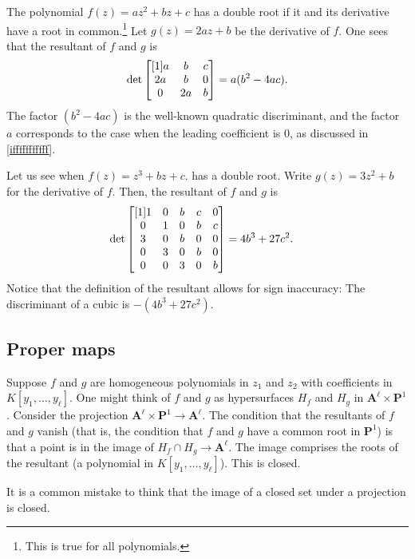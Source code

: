 \documentclass [11 pt, oneside] {article}
\begin{document}
\begin{example}[ ]\label{}\text{}
The polynomial $f(z)=az^2+bz+c$ has a double root if it and its derivative have a root in common.\footnote{This is true for all polynomials.} Let $g(z)=2az+b$ be the derivative of $f$. One sees that the resultant of $f$ and $g$ is
\begin{align*}
	\det\begin{bmatrix} [1] a&b&c\\2a&b&0\\0&2a&b\end{bmatrix} = a(b^2-4ac).
\end{align*}
The factor $(b^2-4ac)$ is the well-known quadratic discriminant, and the factor $a$ corresponds to the case when the leading coefficient is $0$, as discussed in \cref{ifffffffffff}.  
\end{example}

\begin{example}[ ]\label{}\text{}
Let us see when $f(z)=z^3+bz+c$. has a double root. Write $g (z)= 3z^2 + b$ for the derivative of $f$. Then, the resultant of $f$ and $g$ is
\begin{align*}
	\det\begin{bmatrix} [1] 1&0&b&c&0\\0&1&0&b&c\\3&0&b&0&0\\0&3&0&b&0\\0&0&3&0&b\end{bmatrix}&= 4b^3+27c^2.
\end{align*}
Notice that the definition of the resultant allows for sign inaccuracy: The discriminant of a cubic is $-(4b^3+27c^2)$.
\end{example}

\subsection{Proper maps}
Suppose $f$ and $g$ are homogeneous polynomials in $z_1$ and $z_2$ with coefficients in $K[y_1,\hdots, y_\ell]$. One might think of $f$ and $g$ as hypersurfaces $H_f$ and $H_g$ in $\mathbf{A}^\ell\times \mathbf{P}^1$. Consider the projection $\mathbf{A}^\ell\times \mathbf{P}^1\longrightarrow \mathbf{A}^\ell$. The condition that the resultants of $f$ and $g$ vanish (that is, the condition that $f$ and $g$ have a common root in $\mathbf{P}^1$) is that a point is in the image of $H_f\cap H_g\longrightarrow \mathbf{A}^\ell$. The image comprises the roots of the resultant (a polynomial in $K[y_1,\hdots,y_\ell]$). This is closed.

\begin{remark}
	It is a common mistake to think that the image of a closed set under a projection is closed.
\end{remark}
\end{document}
